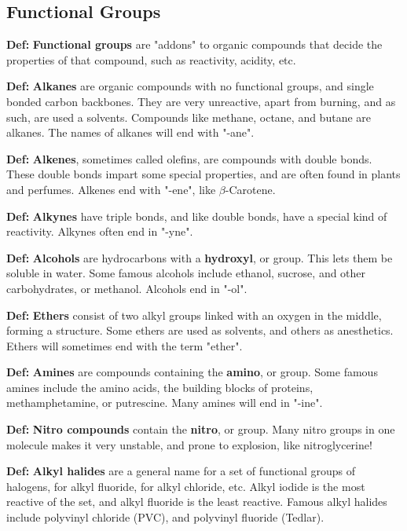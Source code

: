 \documentclass{article}
\begin{document}
\subsection{Functional Groups}

\textbf{Def:} \textbf{Functional groups} are "addons" to organic compounds that decide the properties of that compound, such as reactivity, acidity, etc.

\textbf{Def:} \textbf{Alkanes} are organic compounds with no functional groups, and single bonded carbon backbones. They are very unreactive, apart from burning, and as such, are used a solvents. Compounds like methane, octane, and butane are alkanes. The names of alkanes will end with "-ane".

\textbf{Def:} \textbf{Alkenes}, sometimes called olefins, are compounds with  double bonds. These double bonds impart some special properties, and are often found in plants and perfumes. Alkenes end with "-ene", like $\beta$-Carotene.

\textbf{Def:} \textbf{Alkynes} have  triple bonds, and like double bonds, have a special kind of reactivity. Alkynes often end in "-yne".

\textbf{Def:} \textbf{Alcohols} are hydrocarbons with a \textbf{hydroxyl}, or  group. This lets them be soluble in water. Some famous alcohols include ethanol, sucrose, and other carbohydrates, or methanol. Alcohols end in "-ol".

\textbf{Def:} \textbf{Ethers} consist of two alkyl groups linked with an oxygen in the middle, forming a  structure. Some ethers are used as solvents, and others as anesthetics. Ethers will sometimes end with the term "ether".

\textbf{Def:} \textbf{Amines} are compounds containing the \textbf{amino}, or  group. Some famous amines include the amino acids, the building blocks of proteins, methamphetamine, or putrescine. Many amines will end in "-ine".

\textbf{Def:} \textbf{Nitro compounds} contain the \textbf{nitro}, or  group. Many nitro groups in one molecule makes it very unstable, and prone to explosion, like nitroglycerine!

\textbf{Def:} \textbf{Alkyl halides} are a general name for a set of functional groups of halogens,  for alkyl fluoride,  for alkyl chloride, etc. Alkyl iodide is the most reactive of the set, and alkyl fluoride is the least reactive. Famous alkyl halides include polyvinyl chloride (PVC), and polyvinyl fluoride (Tedlar).
\end{document}
